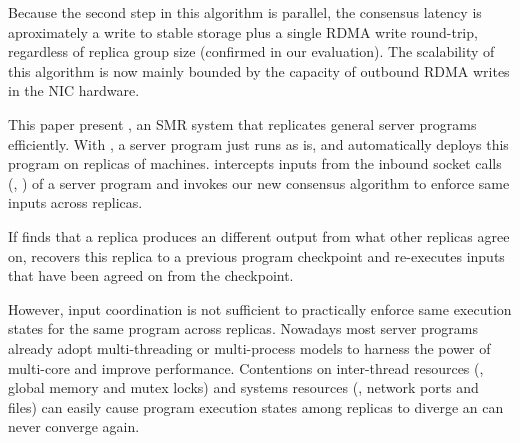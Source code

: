 Because the second step in this algorithm is parallel, the consensus latency is 
aproximately a write to stable storage plus a single RDMA write round-trip, 
regardless of replica group size (confirmed in our evaluation). The scalability 
of this algorithm is now mainly bounded by the capacity of outbound RDMA writes 
in the NIC hardware.

This paper present \xxx, an SMR system that replicates general server programs 
efficiently. With \xxx, a server program just runs as is, and \xxx 
automatically deploys this program on replicas of machines. \xxx intercepts 
inputs from the inbound socket calls (\eg, \recv) of a server program and 
invokes our new consensus algorithm to enforce same inputs across replicas.

If \xxx finds that 
a replica produces an different output from what other replicas agree on, \xxx 
recovers this replica to a previous program checkpoint and re-executes inputs 
that have been agreed on from the checkpoint. 





However, input coordination is not sufficient to practically enforce same 
execution states for the same program across replicas. Nowadays most server 
programs already adopt multi-threading or multi-process models to harness the 
power of multi-core and improve performance. Contentions on inter-thread 
resources (\eg, global memory and \pthread mutex locks) and systems resources 
(\eg, network ports and files) can easily cause program execution states among 
replicas to diverge an can never converge again. 

